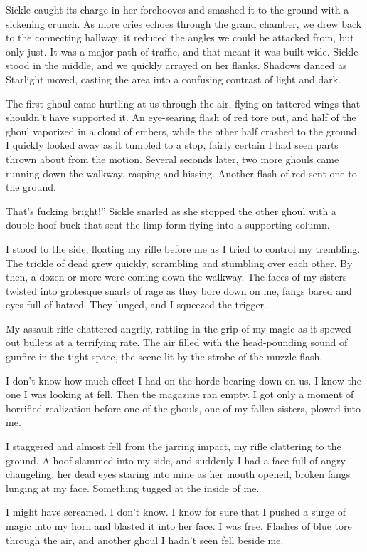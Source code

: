 Sickle caught its charge in her forehooves and smashed it to the ground with a sickening crunch. As more cries echoes through the grand chamber, we drew back to the connecting hallway; it reduced the angles we could be attacked from, but only just. It was a major path of traffic, and that meant it was built wide. Sickle stood in the middle, and we quickly arrayed on her flanks. Shadows danced as Starlight moved, casting the area into a confusing contrast of light and dark.

The first ghoul came hurtling at us through the air, flying on tattered wings that shouldn’t have supported it. An eye-searing flash of red tore out, and half of the ghoul vaporized in a cloud of embers, while the other half crashed to the ground. I quickly looked away as it tumbled to a stop, fairly certain I had seen parts thrown about from the motion. Several seconds later, two more ghouls came running down the walkway, rasping and hissing. Another flash of red sent one to the ground.

\leavevmode{}That’s fucking bright!” Sickle snarled as she stopped the other ghoul with a double-hoof buck that sent the limp form flying into a supporting column.

I stood to the side, floating my rifle before me as I tried to control my trembling. The trickle of dead grew quickly, scrambling and stumbling over each other. By then, a dozen or more were coming down the walkway. The faces of my sisters twisted into grotesque snarls of rage as they bore down on me, fangs bared and eyes full of hatred. They lunged, and I squeezed the trigger.

My assault rifle chattered angrily, rattling in the grip of my magic as it spewed out bullets at a terrifying rate. The air filled with the head-pounding sound of gunfire in the tight space, the scene lit by the strobe of the muzzle flash.

I don’t know how much effect I had on the horde bearing down on us. I know the one I was looking at fell. Then the magazine ran empty. I got only a moment of horrified realization before one of the ghouls, one of my fallen sisters, plowed into me.

I staggered and almost fell from the jarring impact, my rifle clattering to the ground. A hoof slammed into my side, and suddenly I had a face-full of angry changeling, her dead eyes staring into mine as her mouth opened, broken fangs lunging at my face. Something tugged at the inside of me.

I might have screamed. I don’t know. I know for sure that I pushed a surge of magic into my horn and blasted it into her face. I was free. Flashes of blue tore through the air, and another ghoul I hadn’t seen fell beside me.

